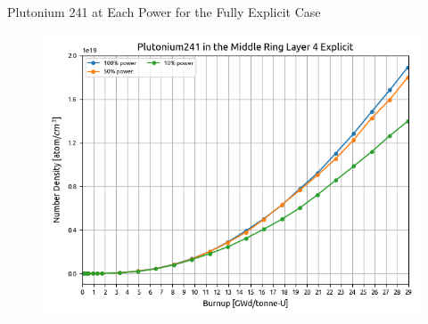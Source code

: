 \documentclass[9pt,t,aspectratio=169]{beamer}
\begin{document}
\begin{frame}{Plutonium 241 at Each Power for the Fully Explicit Case}
    \begin{figure}
        \vspace*{-0.4cm}
        \centering
            \includegraphics[height=0.9\textheight]{figures/explicit_Pu_241.png}
    \end{figure}
\end{frame}
\end{document}
